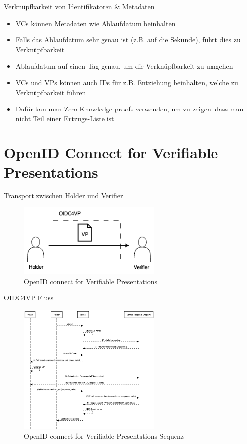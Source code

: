 \documentclass[
	german,%
	authorontitle=true,
	]{bfhbeamer}
\begin{document}
\begin{frame}{Verknüpfbarkeit von Identifikatoren \& Metadaten}
    \begin{itemize}
        \item VCs können Metadaten wie Ablaufdatum beinhalten
        \item Falls das Ablaufdatum sehr genau ist (z.B. auf die Sekunde), führt dies zu Verknüpfbarkeit
        \item Ablaufdatum auf einen Tag genau, um die Verknüpfbarkeit zu umgehen
        \item VCs und VPs können auch IDs für z.B. Entziehung beinhalten, welche zu Verknüpfbarkeit führen
        \item Dafür kan man Zero-Knowledge proofs verwenden, um zu zeigen, dass man nicht Teil einer Entzugs-Liste ist
    \end{itemize}
\end{frame}

\section{OpenID Connect for Verifiable Presentations}

\begin{frame}{Transport zwischen Holder und Verifier}
    \begin{figure}
        \centering
        \includegraphics[width=70mm]{../img/OIDC4VP.png}
        \caption{OpenID connect for Verifiable Presentations}
    \end{figure}
\end{frame}

\begin{frame}{OIDC4VP Fluss}
    \begin{figure}
        \centering
        \includegraphics[width=70mm]{../img/OIDC4VPFlow.png}
        \caption{OpenID connect for Verifiable Presentations Sequenz}
    \end{figure}
\end{frame}
\end{document}
